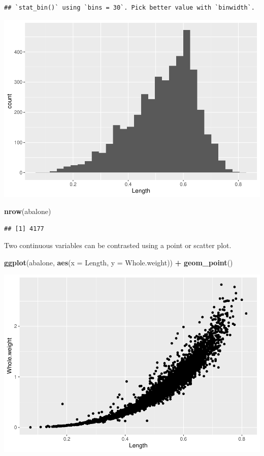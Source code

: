 \documentclass[
]{book}
\newenvironment{Shaded}{\begin{snugshade}}{\end{snugshade}}
\newcommand{\AttributeTok}[1]{\textcolor[rgb]{0.13,0.29,0.53}{#1}}
\newcommand{\FunctionTok}[1]{\textcolor[rgb]{0.13,0.29,0.53}{\textbf{#1}}}
\newcommand{\NormalTok}[1]{#1}
\newcommand{\SpecialCharTok}[1]{\textcolor[rgb]{0.81,0.36,0.00}{\textbf{#1}}}
\begin{document}
\begin{verbatim}
## `stat_bin()` using `bins = 30`. Pick better value with `binwidth`.
\end{verbatim}

\includegraphics{_main_files/figure-latex/unnamed-chunk-43-1.pdf}

\begin{Shaded}
\begin{Highlighting}[]
\FunctionTok{nrow}\NormalTok{(abalone)}
\end{Highlighting}
\end{Shaded}

\begin{verbatim}
## [1] 4177
\end{verbatim}

Two continuous variables can be contrasted using a point or scatter plot.

\begin{Shaded}
\begin{Highlighting}[]
\FunctionTok{ggplot}\NormalTok{(abalone, }\FunctionTok{aes}\NormalTok{(}\AttributeTok{x =}\NormalTok{ Length, }\AttributeTok{y =}\NormalTok{ Whole.weight)) }\SpecialCharTok{+} 
  \FunctionTok{geom\_point}\NormalTok{()}
\end{Highlighting}
\end{Shaded}

\includegraphics{_main_files/figure-latex/unnamed-chunk-44-1.pdf}
\end{document}

